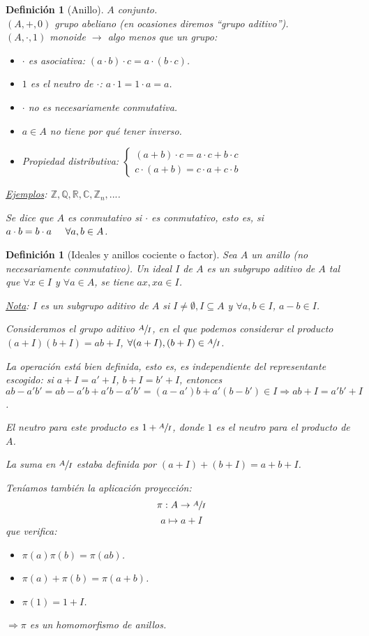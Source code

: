 \documentclass[11pt,a4paper]{article}
\theoremstyle{break}
\newtheorem{definition}[theorem]{Definición}
\begin{document}
\begin{definition}[Anillo]
$A$ conjunto. \\
$(A, +, 0)$ grupo abeliano (en ocasiones diremos ``grupo aditivo''). \\
$(A, \cdot, 1)$ monoide $\rightarrow$ algo menos que un grupo:
\begin{itemize}
\item $\cdot$ es asociativa: $(a \cdot b) \cdot c = a \cdot (b \cdot c)$.
\item $1$ es el neutro de $\cdot$: $a \cdot 1 = 1 \cdot a = a$.
\item $\cdot$ no es necesariamente conmutativa.
\item $a \in A$ no tiene por qué tener inverso.
\item Propiedad distributiva:
$\begin{cases}
(a + b) \cdot c = a \cdot c + b \cdot c \\
c \cdot (a + b) = c \cdot a + c \cdot b
\end{cases}$
\end{itemize}

\underline{Ejemplos}: $\mathbb{Z}, \mathbb{Q}, \mathbb{R}, \mathbb{C}, \mathbb{Z}_{n}, ...$.

Se dice que $A$ es conmutativo si $\cdot$ es conmutativo, esto es, si $a \cdot b = b \cdot a \hspace{0.5cm} \forall a, b \in A$.
\end{definition}

\begin{definition}[Ideales y anillos cociente o factor]
Sea $A$ un anillo (no necesariamente conmutativo). Un ideal $I$ de $A$ es un subgrupo aditivo de $A$ tal que $\forall x \in I$ y $\forall a \in A$, se tiene $ax, xa \in I$.

\underline{Nota}: $I$ es un subgrupo aditivo de $A$ si $I \neq \emptyset, I \subseteq A$ y $\forall a, b \in I$, $a-b \in I$.

Consideramos el grupo aditivo $\sfrac{A}{I}$, en el que podemos considerar el producto $(a + I) (b + I) = ab + I$, $\forall (a + I), (b + I) \in \sfrac{A}{I}$.

La operación está bien definida, esto es, es independiente del representante escogido: si $a + I = a' + I$, $b + I = b' + I$, entonces $ab - a'b' = ab - a'b + a'b - a'b' = (a - a')b + a'(b - b') \in I \Rightarrow ab + I = a'b' +I$.

El neutro para este producto es $1 + \sfrac{A}{I}$, donde $1$ es el neutro para el producto de $A$.

La suma en $\sfrac{A}{I}$ estaba definida por $(a + I) + (b + I) = a + b + I$.

Teníamos también la aplicación proyección:
$$\pi: A \to \sfrac{A}{I}$$
$$a \mapsto a + I$$
que verifica:
\begin{itemize}
\item $\pi(a) \pi(b) = \pi(ab)$.
\item $\pi(a) + \pi(b) = \pi(a+b)$.
\item $\pi(1) = 1 + I$.
\end{itemize}
$\Rightarrow \pi$ es un homomorfismo de anillos.
\end{definition}
\end{document}

